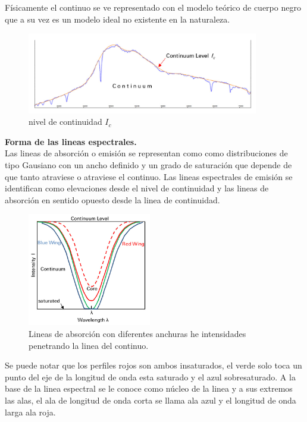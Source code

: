 \noindent Físicamente el continuo se ve representado con el modelo teórico de cuerpo negro que a su vez es un modelo  ideal no existente en la naturaleza.\\

\begin{figure}[htb!]
\centering
\includegraphics[width=0.9\textwidth]{images/8.jpeg}
\caption[Descripción versión comprimida]{nivel de continuidad $I_c$\cite{libro}}
 \label{fig2}
\end{figure}

\newpage
\noindent \textbf{Forma de las lineas espectrales.}\\

\noindent Las lineas de absorción o emisión se representan como como distribuciones de tipo Gausiano con un ancho definido y un grado de saturación que depende de que tanto atraviese o atraviese el continuo.
Las lineas espectrales de emisión se identifican como elevaciones desde el nivel de continuidad y las lineas de absorción en sentido opuesto desde la linea de continuidad.

\begin{figure}[htb!]
\centering
\includegraphics[width=0.48\textwidth]{images/9.jpeg}
\caption[Descripción versión comprimida]{Lineas de absorción con diferentes anchuras he intensidades penetrando la linea del continuo.\cite{libro}}
 \label{fig2}
\end{figure}

\noindent Se puede notar que los perfiles rojos son ambos insaturados, el verde solo toca un punto del eje de la longitud de onda esta saturado y el azul sobresaturado. A la base de la linea espectral se le conoce como núcleo de la linea y a sus extremos las alas, el ala de longitud de onda corta se llama ala azul y el longitud de onda larga ala roja.
\newpage

